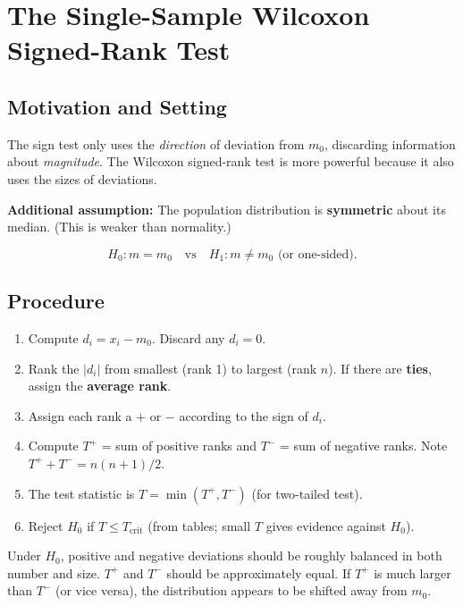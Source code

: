 \documentclass[12pt, a4paper, oneside]{book}
\theoremstyle{definition}
\theoremstyle{plain}
\theoremstyle{remark}
\begin{document}
\section{The Single-Sample Wilcoxon Signed-Rank Test}
\label{sec:wilcoxon-single}

\subsection{Motivation and Setting}

The sign test only uses the \emph{direction} of deviation from $m_0$,
discarding information about \emph{magnitude}.  The Wilcoxon signed-rank
test is more powerful because it also uses the sizes of deviations.

\textbf{Additional assumption:} The population distribution is
\textbf{symmetric} about its median.  (This is weaker than normality.)

\[
  H_0: m = m_0 \quad\text{vs}\quad H_1: m \ne m_0 \text{ (or one-sided)}.
\]

\subsection{Procedure}

\begin{enumerate}[label=\textbf{Step \arabic*:}]
  \item Compute $d_i = x_i - m_0$.  Discard any $d_i=0$.
  \item Rank the $|d_i|$ from smallest (rank 1) to largest (rank $n$).
        If there are \textbf{ties}, assign the \textbf{average rank}.
  \item Assign each rank a $+$ or $-$ according to the sign of $d_i$.
  \item Compute $T^+$ = sum of positive ranks and $T^-$ = sum of negative ranks.
        Note $T^+ + T^- = n(n+1)/2$.
  \item The test statistic is $T = \min(T^+, T^-)$ (for two-tailed test).
  \item Reject $H_0$ if $T \le T_{\text{crit}}$ (from tables; small $T$
        gives evidence against $H_0$).
\end{enumerate}

\begin{intuition}
Under $H_0$, positive and negative deviations should be roughly balanced in
both number and size.  $T^+$ and $T^-$ should be approximately equal.  If
$T^+$ is much larger than $T^-$ (or vice versa), the distribution appears to
be shifted away from $m_0$.
\end{intuition}
\end{document}
